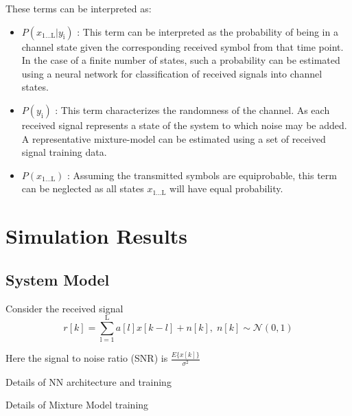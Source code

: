 \documentclass[12pt,a4paper]{report}
\begin{document}
These terms can be interpreted as:

\begin{itemize}
\item $P(x_{\mathrm{1 ... L}}|y_{\mathrm{i}})$
: This term can be interpreted as the probability of being in a channel state given the corresponding received symbol from that time point. In the case of a finite number of states, such a probability can be estimated using a neural network for classification of received signals into channel states. 
\item $P(y_{\mathrm{i}})$
: This term characterizes the randomness of the channel. As each received signal represents a state of the system to which noise may be added. A representative mixture-model can be estimated using a set of received signal training data. 
\item $P(x_{\mathrm{1 ... L}})$
: Assuming the transmitted symbols are equiprobable, this term can be neglected as all states $x_{\mathrm{1 ... L}}$ will have equal probability. 

\end{itemize}






\section{Simulation Results}
\subsection{System Model}
Consider the received signal 
\begin{equation}
r[k] = \sum_{\mathrm{l=1}}^{\mathrm{L}} a[l]x[k-l] + n[k], \; n[k]  \sim \mathcal{N}(0,1)
\end{equation}


Here the signal to noise ratio (SNR) is 
$\frac{E\{x[k]\}}{\sigma^2}$

Details of NN architecture and training

Details of Mixture Model training
\end{document}
